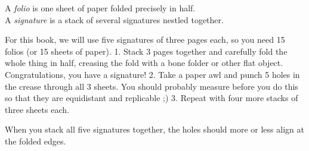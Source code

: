 \documentclass[
  openany]{book}
\begin{document}
A \emph{folio} is one sheet of paper folded precisely in half.\\
A \emph{signature} is a stack of several signatures nestled together.

For this book, we will use five signatures of three pages each, so you need 15 folios (or 15 sheets of paper).
1. Stack 3 pages together and carefully fold the whole thing in half, creasing the fold with a bone folder or other flat object. Congratulations, you have a signature!
2. Take a paper awl and punch 5 holes in the crease through all 3 sheets. You should probably measure before you do this so that they are equidistant and replicable ;)
3. Repeat with four more stacks of three sheets each.

When you stack all five signatures together, the holes should more or less align at the folded edges.
\end{document}
